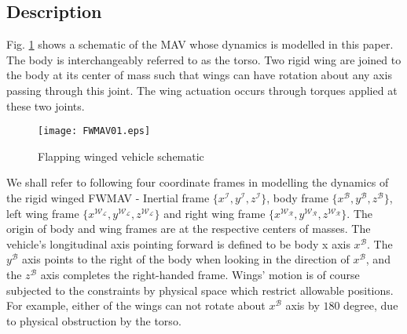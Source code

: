 \documentclass[letterpaper, 10 pt, conference]{ieeeconf}  \newcommand{\RN}[1]{\textup{\uppercase\expandafter{\romannumeral#1}}}
\begin{document}
\subsection{Description}
Fig. \ref{fig:Flapping winged vehicle schematic} shows a schematic of the MAV whose dynamics is modelled in this paper. The body is interchangeably referred to as the torso. Two rigid wing are joined to the body at its center of mass such that wings can have rotation about any axis passing through this joint. The wing actuation occurs through torques applied at these two joints.

\vspace{10pt}
\begin{figure}[!htb]
\centering
\texttt{[image: FWMAV01.eps]}
\caption{Flapping winged vehicle schematic}
\label{fig:Flapping winged vehicle schematic}
\end{figure}

We shall refer to following four coordinate frames in modelling the dynamics of the rigid winged FWMAV - Inertial frame $\{x^\mathcal{I},y^\mathcal{I},z^\mathcal{I}\}$, body frame $\{x^\mathcal{B},y^\mathcal{B},z^\mathcal{B}\}$, left wing frame $\{x^\mathcal{W_L},y^\mathcal{W_L},z^\mathcal{W_L}\}$ and right wing frame $\{x^\mathcal{W_R},y^\mathcal{W_R},z^\mathcal{W_R}\}$. The origin of body and wing frames are at the respective centers of masses. The vehicle's longitudinal axis pointing forward is defined to be body x axis $x^\mathcal{B}$. The $y^\mathcal{B}$ axis points to the right of the body when looking in the direction of $x^\mathcal{B}$, and the $z^\mathcal{B}$ axis completes the right-handed frame. Wings' motion is of course subjected to the constraints by physical space which restrict allowable positions. For example, either of the wings can not rotate about $x^\mathcal{B}$ axis by $180$ degree, due to physical obstruction by the torso. 
\end{document}

